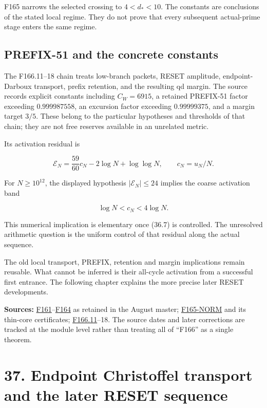 \documentclass[
  10pt,
  a4paper,
  10pt,
  oneside,
  openany]{book}
\begin{document}
F165 narrows the selected crossing to \(4<d_*<10\). The constants are
conclusions of the stated local regime. They do not prove that every
subsequent actual-prime stage enters the same regime.

\subsection{PREFIX-51 and the concrete
constants}\label{prefix-51-and-the-concrete-constants}

The F166.11--18 chain treats low-branch packets, RESET amplitude,
endpoint-Darboux transport, prefix retention, and the resulting qd
margin. The source records explicit constants including \(C_W=6915\), a
retained PREFIX-51 factor exceeding \(0.999987558\), an excursion factor
exceeding \(0.99999375\), and a margin target \(3/5\). These belong to
the particular hypotheses and thresholds of that chain; they are not
free reserves available in an unrelated metric.

Its activation residual is

\[
 \mathcal E_N=\frac{59}{60}c_N-2\log N+\log\log N,
 \qquad c_N=u_N/N.
 \tag{36.7}\label{eq:36.7}
\]

For \(N\ge10^{12}\), the displayed hypothesis \(|\mathcal E_N|\le24\)
implies the coarse activation band

\[
 \log N<c_N<4\log N.
 \tag{36.8}\label{eq:36.8}
\]

This numerical implication is elementary once (36.7) is controlled. The
unresolved arithmetic question is the uniform control of that residual
along the actual sequence.

The old local transport, PREFIX, retention and margin implications
remain reusable. What cannot be inferred is their all-cycle activation
from a successful first entrance. The following chapter explains the
more precise later RESET developments.

\textbf{Sources:}
\hyperref[source-f161]{F161}--\hyperref[source-f164]{F164} as retained
in the August master; \hyperref[source-f165-norm]{F165-NORM} and its
thin-core certificates; \hyperref[source-f166-11]{F166.11}--18. The
source dates and later corrections are tracked at the module level
rather than treating all of ``F166'' as a single theorem.

\section{37. Endpoint Christoffel transport and the later RESET
sequence}\label{ch-reset-index}
\end{document}
